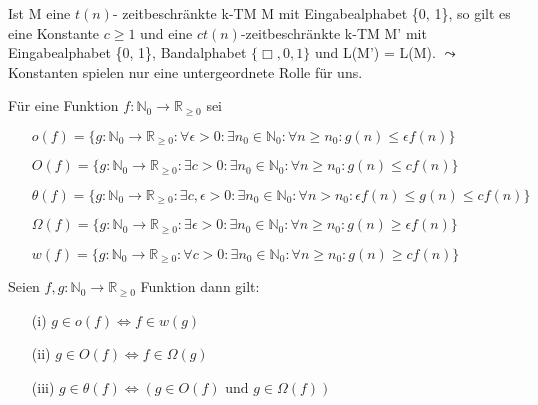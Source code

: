     Ist M eine \(t(n)\)- zeitbeschränkte k-TM M mit Eingabealphabet \{0, 1\}, so gilt es eine Konstante \(c \geq 1\) und eine \(ct(n)\)-zeitbeschränkte k-TM M' mit Eingabealphabet \{0, 1\}, Bandalphabet \(\{\Box, 0, 1\}\) und L(M') = L(M).
    \medskip
    \(\leadsto\) Konstanten spielen nur eine untergeordnete Rolle für uns.

    Für eine Funktion \(f: \mathbb{N}_0 \to \mathbb{R}_{\geq 0}\) sei
    \begin{itemize}
        \item [] \(o(f) = \{g: \mathbb{N}_0 \to \mathbb{R}_{\geq 0} : \forall \epsilon > 0 : \exists n_0 \in \mathbb{N}_0 : \forall n \geq n_0 : g(n) \leq \epsilon f(n)\}\)
        \item [] \(O(f) = \{g: \mathbb{N}_0 \to \mathbb{R}_{\geq 0} : \exists c > 0 : \exists n_0 \in \mathbb{N}_0 : \forall n \geq n_0 : g(n) \leq c f(n)\}\)
        \item [] \(\theta(f) = \{g: \mathbb{N}_0 \to \mathbb{R}_{\geq 0} : \exists c, \epsilon > 0 : \exists n_0 \in \mathbb{N}_0 : \forall n > n_0 : \epsilon f(n) \leq g(n) \leq cf(n)\}\)
        \item [] \(\Omega (f) = \{g: \mathbb{N}_0 \to \mathbb{R}_{\geq 0} : \exists \epsilon > 0 : \exists n_0 \in \mathbb{N}_0 : \forall n \geq n_0 : g(n) \geq \epsilon f(n)\}\)
        \item [] \(w(f) = \{g: \mathbb{N}_0 \to \mathbb{R}_{\geq 0} : \forall c > 0 : \exists n_0 \in \mathbb{N}_0 : \forall n \geq n_0 : g(n) \geq c f(n)\}\)
    \end{itemize}

    Seien \(f, g : \mathbb{N}_0 \to \mathbb{R}_{\geq 0}\) Funktion dann gilt:
    \begin{itemize}
        \item [(i)] \(g \in o(f) \Leftrightarrow f \in w(g)\)
        \item [(ii)] \(g \in O(f) \Leftrightarrow f \in \Omega(g)\)
        \item [(iii)] \(g \in \theta(f) \Leftrightarrow ( g \in O(f) \text{ und }g \in \Omega(f))\)
    \end{itemize}

